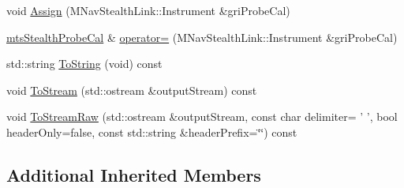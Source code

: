 \begin{DoxyCompactItemize}
\item 
void \hyperlink{classmts_stealth_probe_cal_a12fba432fb2433807140105bbb21c90b}{Assign} (M\-Nav\-Stealth\-Link\-::\-Instrument \&gri\-Probe\-Cal)
\item 
\hyperlink{classmts_stealth_probe_cal}{mts\-Stealth\-Probe\-Cal} \& \hyperlink{classmts_stealth_probe_cal_aa2917c905dce23705b3efc6c925b1d94}{operator=} (M\-Nav\-Stealth\-Link\-::\-Instrument \&gri\-Probe\-Cal)
\item 
std\-::string \hyperlink{classmts_stealth_probe_cal_a004a8c73e318b8357ba895e24c598879}{To\-String} (void) const 
\item 
void \hyperlink{classmts_stealth_probe_cal_a8269e2a53a6d7855c7385873c1a74a0e}{To\-Stream} (std\-::ostream \&output\-Stream) const 
\item 
void \hyperlink{classmts_stealth_probe_cal_a7399576b98cc2bb01a68628d7c1d93f9}{To\-Stream\-Raw} (std\-::ostream \&output\-Stream, const char delimiter= ' ', bool header\-Only=false, const std\-::string \&header\-Prefix=\char`\"{}\char`\"{}) const 
\end{DoxyCompactItemize}
\subsection*{Additional Inherited Members}


